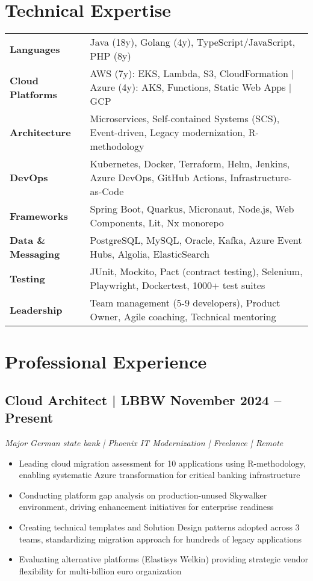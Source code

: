\documentclass[10pt,a4paper]{article}
\begin{document}
\vspace{3pt}

\section*{Technical Expertise}

\renewcommand{\arraystretch}{1.1}
\begin{tabularx}{\textwidth}{@{}l X@{}}
\textbf{Languages} & Java (18y), Golang (4y), TypeScript/JavaScript, PHP (8y) \\
\textbf{Cloud Platforms} & AWS (7y): EKS, Lambda, S3, CloudFormation | Azure (4y): AKS, Functions, Static Web Apps | GCP \\
\textbf{Architecture} & Microservices, Self-contained Systems (SCS), Event-driven, Legacy modernization, R-methodology \\
\textbf{DevOps} & Kubernetes, Docker, Terraform, Helm, Jenkins, Azure DevOps, GitHub Actions, Infrastructure-as-Code \\
\textbf{Frameworks} & Spring Boot, Quarkus, Micronaut, Node.js, Web Components, Lit, Nx monorepo \\
\textbf{Data \& Messaging} & PostgreSQL, MySQL, Oracle, Kafka, Azure Event Hubs, Algolia, ElasticSearch \\
\textbf{Testing} & JUnit, Mockito, Pact (contract testing), Selenium, Playwright, Dockertest, 1000+ test suites \\
\textbf{Leadership} & Team management (5-9 developers), Product Owner, Agile coaching, Technical mentoring
\end{tabularx}

\newpage

\section*{Professional Experience}

\subsection*{Cloud Architect | LBBW \hfill November 2024 -- Present}
\textit{Major German state bank | Phoenix IT Modernization | Freelance | Remote}
\begin{itemize}
\item Leading cloud migration assessment for 10 applications using R-methodology, enabling systematic Azure transformation for critical banking infrastructure
\item Conducting platform gap analysis on production-unused Skywalker environment, driving enhancement initiatives for enterprise readiness
\item Creating technical templates and Solution Design patterns adopted across 3 teams, standardizing migration approach for hundreds of legacy applications
\item Evaluating alternative platforms (Elastisys Welkin) providing strategic vendor flexibility for multi-billion euro organization
\end{itemize}
\end{document}
